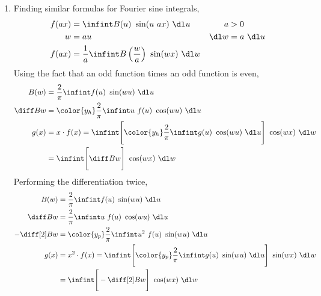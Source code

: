 \begin{enumerate}
\begin{enumerate}
              \item Finding similar formulas for Fourier sine integrals,
                    \begin{align}
                        f(ax) & = \infint B(u)\ \sin(u\ ax)\ \dl u       &
                        a     & > 0                                        \\
                        w     & = au                                     &
                        \dl w & = a\ \dl u                                 \\
                        f(ax) & = \frac{1}{a}\infint B\left( \frac{w}{a}
                        \right)\ \sin(wx)\ \dl w
                    \end{align}
                    Using the fact that an odd function times an odd function is even,
                    \begin{align}
                        B(w)     & = \frac{2}{\pi} \infint f(u)\ \sin(wu)
                        \ \dl u                                                 \\
                        \diff Bw & = \color{y_h}\frac{2}{\pi} \infint u\ f(u)
                        \ \cos(wu) \ \dl u                                      \\
                        g(x)     & = x \cdot f(x) = \infint  \Bigg[{\color{y_h}
                                    \frac{2}{\pi} \infint g(u)\ \cos(wu)\ \dl u}
                        \Bigg]\ \cos(wx)\ \dl w                                 \\
                                 & = \infint \Bigg[ \diff Bw \Bigg]
                        \ \cos(wx)\ \dl w
                    \end{align}
                    Performing the differentiation twice,
                    \begin{align}
                        B(w)         & = \frac{2}{\pi} \infint f(u)\ \sin(wu)
                        \ \dl u                                                       \\
                        \diff Bw     & = \frac{2}{\pi} \infint u\ f(u)
                        \ \cos(wu) \ \dl u                                            \\
                        -\diff[2] Bw & = \color{y_p}\frac{2}{\pi} \infint u^2\ f(u)
                        \ \sin(wu) \ \dl u                                            \\
                        g(x)         & = x^2 \cdot f(x) = \infint  \Bigg[{\color{y_p}
                                    \frac{2}{\pi} \infint g(u)\ \sin(wu)\ \dl u}
                        \Bigg]\ \sin(wx)\ \dl w                                       \\
                                     & = \infint \Bigg[ -\diff[2] Bw \Bigg]
                        \ \cos(wx)\ \dl w
                    \end{align}
          \end{enumerate}


\end{enumerate}
